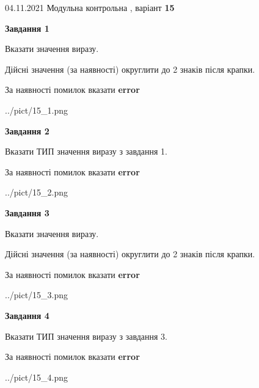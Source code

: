 \documentclass[11pt, ukrainian]{article}
\begin{document}
{04.11.2021 Модульна контрольна , варіант  \No \textbf { 15 }\par}
{
\begin {large}
{\begin {center}\textbf{Завдання 1}\end {center}}\par
Вказати значення виразу. \par
Дійсні значення (за наявності) округлити до 2 знаків після крапки. \par
За наявності помилок вказати \textbf{error}

\begin{center}
	{../pict/15_1.png}
\end{center}
\newpage

{\begin {center}\textbf{Завдання 2}\end {center}}\par
Вказати ТИП значення виразу з завдання 1. \par
За наявності помилок вказати \textbf{error}

\begin{center}
	{../pict/15_2.png}
\end{center}
\newpage

{\begin {center}\textbf{Завдання 3}\end {center}}\par
Вказати значення виразу. \par
Дійсні значення (за наявності) округлити до 2 знаків після крапки. \par
За наявності помилок вказати \textbf{error}

\begin{center}
	{../pict/15_3.png}
\end{center}
\newpage

{\begin {center}\textbf{Завдання 4}\end {center}}\par
Вказати ТИП значення виразу з завдання 3. \par
За наявності помилок вказати \textbf{error}

\begin{center}
	{../pict/15_4.png}
\end{center}
\newpage


\end{large}}
\end{document}
